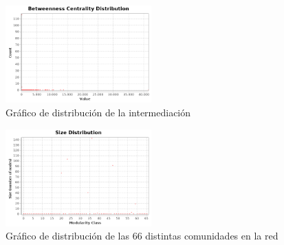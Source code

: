 \documentclass[10pt,a4paper,spanish]{article}
\numberwithin{equation}{section} %
\numberwithin{figure}{section} %
\numberwithin{table}{section} %
\begin{document}
\begin{figure}[!h]
    \centering
    \includegraphics[width=0.5\textwidth]{distance-report/Betweenness-Centrality-Distribution}
    \caption{Gráfico de distribución de la intermediación}
    \label{bet}
\end{figure}

\begin{figure}[!h]
    \centering
    \includegraphics[width=0.5\textwidth]{modularity-report/communities-size-distribution}
    \caption{Gráfico de distribución de las 66 distintas comunidades en la red}
    \label{com}
\end{figure}
\end{document}
